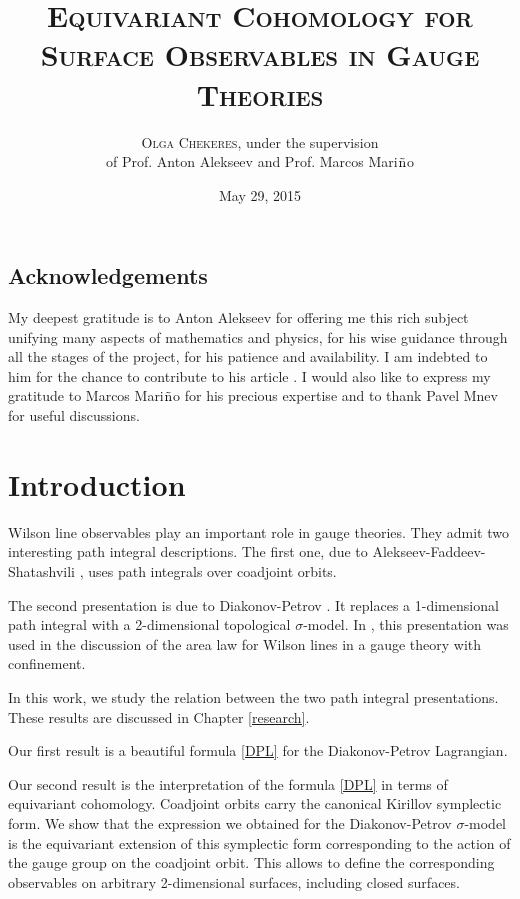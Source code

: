 \documentclass[11pt]{report}
\title{\textsc{Equivariant Cohomology for Surface Observables in Gauge Theories}}
\author{\textsc{Olga Chekeres}, under the supervision \\
of Prof. Anton Alekseev and Prof. Marcos Mari${\rm\tilde{n}}$o}
\date{May 29, 2015}
\theoremstyle{plain}
\theoremstyle{definition}
\theoremstyle{remark}
\theoremstyle{remark}
\numberwithin{equation}{section}
\begin{document}
\maketitle
\tableofcontents

\section*{Acknowledgements}

My deepest gratitude is to Anton Alekseev for offering me this rich subject unifying many aspects of mathematics and physics, for his wise guidance through all the stages of the project, for his patience and availability. I am indebted to him for the chance to contribute to his article \cite{ACM}.
I would also like to express my gratitude to Marcos Mari${\rm\tilde{n}}$o for his precious expertise and to thank Pavel Mnev for useful discussions. 


\chapter{Introduction}

   
   Wilson line observables play an important role in gauge theories. They admit two interesting path integral descriptions. The first one, due to Alekseev-Faddeev-Shatashvili \cite{AFS}, uses path integrals over coadjoint orbits. 

The second presentation is due to Diakonov-Petrov \cite{DP}. It replaces a 1-dimensional path integral with a 2-dimensional topological $\sigma$-model. 
In \cite{DP}, this presentation was used in the discussion of the area law for Wilson lines in a gauge theory with confinement.

In this work, we study the relation between the two path integral presentations. These results are discussed in Chapter \ref{research}.

Our first result is a beautiful formula \eqref{DPL} for the 
Diakonov-Petrov Lagrangian. 

Our second result is the interpretation of the formula \eqref{DPL} in terms of equivariant cohomology. 
Coadjoint orbits carry the canonical Kirillov symplectic form. We show that the expression we obtained for the Diakonov-Petrov $\sigma$-model 
is the equivariant extension of this symplectic form corresponding to the action of the gauge group on the coadjoint orbit. This allows to define the corresponding observables on arbitrary 2-dimensional surfaces, including closed surfaces.
\end{document}

